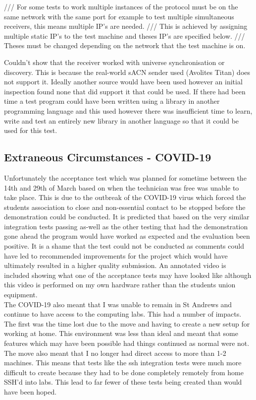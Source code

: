 \documentclass[11pt,a4paper]{article}
\begin{document}
/// For some tests to work multiple instances of the protocol must be on the same network with the same port for example to test multiple simultaneous receivers, this means multiple IP's are needed.
/// This is achieved by assigning multiple static IP's to the test machine and theses IP's are specified below.
/// Theses must be changed depending on the network that the test machine is on.

Couldn't show that the receiver worked with universe synchronisation or discovery. This is because the real-world sACN sender used (Avolites Titan) does not support it. Ideally another source would have been used however an initial inspection found none that did support it that could be used. If there had been time a test program could have been written using a library in another programming language and this used however there was insufficient time to learn, write and test an entirely new library in another language so that it could be used for this test.
 
\subsection{Extraneous Circumstances - COVID-19}
Unfortunately the acceptance test which was planned for sometime between the 14th and 29th of March based on when the technician was free was unable to take place. This is due to the outbreak of the COVID-19 virus which forced the students association to close and non-essential contact to be stopped before the demonstration could be conducted. It is predicted that based on the very similar integration tests passing as-well as the other testing that had the demonstration gone ahead the program would have worked as expected and the evaluation been positive. It is a shame that the test could not be conducted as comments could have led to recommended improvements for the project which would have ultimately resulted in a higher quality submission. An annotated video is included showing what one of the acceptance tests may have looked like although this video is performed on my own hardware rather than the students union equipment.\\

The COVID-19 also meant that I was unable to remain in St Andrews and continue to have access to the computing labs. This had a number of impacts. The first was the time lost due to the move and having to create a new setup for working at home. This environment was less than ideal and meant that some features which may have been possible had things continued as normal were not. The move also meant that I no longer had direct access to more than 1-2 machines. This means that tests like the ssh integration tests were much more difficult to create because they had to be done completely remotely from home SSH'd into labs. This lead to far fewer of these tests being created than would have been hoped. \\
\end{document}
